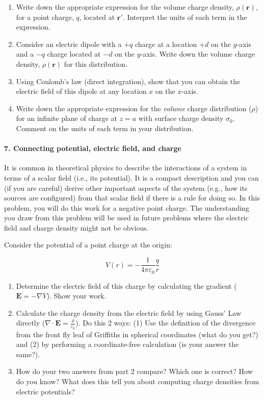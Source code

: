 \documentclass[11pt]{article}
\def\tightlist{}
\begin{document}
\begin{enumerate}
\def\labelenumi{\arabic{enumi}.}
\tightlist
\item
  Write down the appropriate expression for the volume charge density,
  \(\rho(\mathbf{r})\), for a point charge, \(q\), located at
  \(\mathbf{r}'\). Interpret the units of each term in the expression.
\item
  Consider an electric dipole with a \(+q\) charge at a location \(+d\)
  on the \(y\)-axis and a \(-q\) charge located at \(-d\) on the
  \(y\)-axis. Write down the volume charge density, \(\rho(\mathbf{r})\)
  for this distribution.
\item
  Using Coulomb's law (direct integration), show that you can obtain the
  electric field of this dipole at any location \(x\) on the \(x\)-axis.
\item
  Write down the appropriate expression for the \emph{volume} charge
  distribution (\(\rho\)) for an infinite plane of charge at \(z = a\)
  with surface charge density \(\sigma_0\). Comment on the units of each
  term in your distribution.
\end{enumerate}

\paragraph{7. Connecting potential, electric field, and
charge}\label{connecting-potential-electric-field-and-charge}

It is common in theoretical physics to describe the interactions of a
system in terms of a scalar field (i.e., its potential). It is a compact
description and you can (if you are careful) derive other important
aspects of the system (e.g., how its sources are configured) from that
scalar field if there is a rule for doing so. In this problem, you will
do this work for a negative point charge. The understanding you draw
from this problem will be used in future problems where the electric
field and charge density might not be obvious.

Consider the potential of a point charge at the origin:

\[V(r) = -\dfrac{1}{4\pi\varepsilon_0}\dfrac{q}{r}\]

\begin{enumerate}
\def\labelenumi{\arabic{enumi}.}
\tightlist
\item
  Determine the electric field of this charge by calculating the
  gradient (\(\mathbf{E} = -\nabla V\)). Show your work.
\item
  Calculate the charge density from the electric field by using Gauss'
  Law directly
  (\(\nabla \cdot \mathbf{E} = \frac{\rho}{\varepsilon_0}\)). Do this 2
  ways: (1) Use the definition of the divergence from the front fly leaf
  of Griffiths in spherical coordinates (what do you get?) and (2) by
  performing a coordinate-free calculation (is your answer the same?).
\item
  How do your two answers from part 2 compare? Which one is correct? How
  do you know? What does this tell you about computing charge densities
  from electric potentials?
\end{enumerate}
\end{document}

